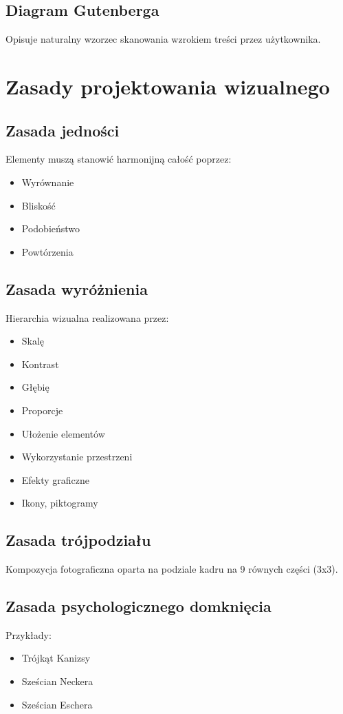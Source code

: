 \subsection{Diagram Gutenberga}
Opisuje naturalny wzorzec skanowania wzrokiem treści przez użytkownika.

\section{Zasady projektowania wizualnego}

\subsection{Zasada jedności}
Elementy muszą stanowić harmonijną całość poprzez:
\begin{itemize}[noitemsep]
    \item Wyrównanie
    \item Bliskość
    \item Podobieństwo
    \item Powtórzenia
\end{itemize}

\subsection{Zasada wyróżnienia}
Hierarchia wizualna realizowana przez:
\begin{itemize}[noitemsep]
    \item Skalę
    \item Kontrast
    \item Głębię
    \item Proporcje
    \item Ułożenie elementów
    \item Wykorzystanie przestrzeni
    \item Efekty graficzne
    \item Ikony, piktogramy
\end{itemize}

\subsection{Zasada trójpodziału}
Kompozycja fotograficzna oparta na podziale kadru na 9 równych części (3x3).

\subsection{Zasada psychologicznego domknięcia}
Przykłady:
\begin{itemize}[noitemsep]
    \item Trójkąt Kanizsy
    \item Sześcian Neckera
    \item Sześcian Eschera
\end{itemize}

